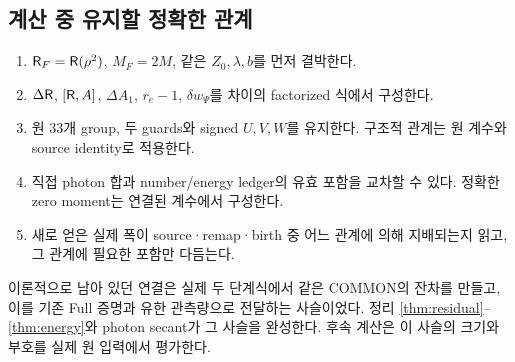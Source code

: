 \subsection{계산 중 유지할 정확한 관계}
\begin{enumerate}
\item $\mathsf R_F=\mathsf R(\rho^2)$, $M_F=2M$, 같은 $Z_0,\lambda,b$를 먼저 결박한다.
\item $\Delta\mathsf R$, $[\mathsf R,A]$, $\Delta A_1$, $r_e-1$, $\delta w_\Psi$를 차이의 factorized 식에서 구성한다.
\item 원 33개 group, 두 guards와 signed $U,V,W$를 유지한다. 구조적 관계는 원 계수와 source identity로 적용한다.
\item 직접 photon 합과 number/energy ledger의 유효 포함을 교차할 수 있다. 정확한 zero moment는 연결된 계수에서 구성한다.
\item 새로 얻은 실제 폭이 source·remap·birth 중 어느 관계에 의해 지배되는지 읽고, 그 관계에 필요한 포함만 다듬는다.
\end{enumerate}
이론적으로 남아 있던 연결은 실제 두 단계식에서 같은 COMMON의 잔차를 만들고,
이를 기존 Full 증명과 유한 관측량으로 전달하는 사슬이었다.
정리 \ref{thm:residual}--\ref{thm:energy}와 photon secant가 그 사슬을 완성한다.
후속 계산은 이 사슬의 크기와 부호를 실제 원 입력에서 평가한다.

